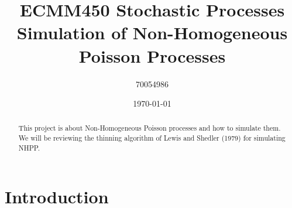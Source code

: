 \documentclass[%
 reprint,
 amsmath,amssymb,
 aps,
]{revtex4-2}
\theoremstyle{definition}
\begin{document}

\title{ECMM450 Stochastic Processes\\Simulation of Non-Homogeneous Poisson Processes}%

\author{70054986}




\date{\today}%

\begin{abstract}
This project is about Non-Homogeneous Poisson processes and how to simulate them. We will be reviewing the thinning algorithm of Lewis and Shedler (1979) for simulating NHPP.
\end{abstract}

\maketitle


\section{\label{sec:level1}Introduction}
\end{document}
